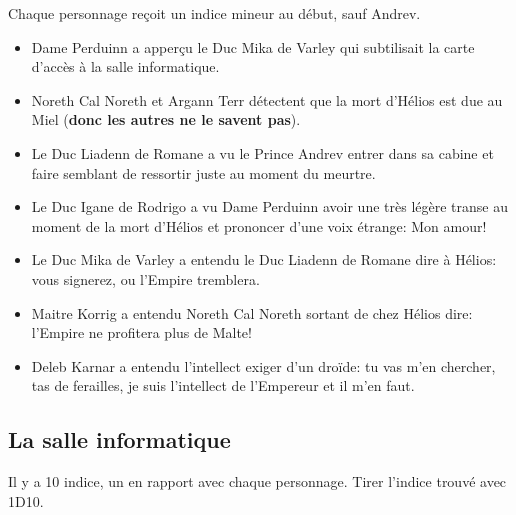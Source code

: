 \documentclass{article}
\begin{document}
Chaque personnage reçoit un indice mineur au début, sauf Andrev.
\begin{itemize}
    \item Dame Perduinn a apperçu le Duc Mika de Varley qui subtilisait la
        carte d'accès à la salle informatique.
    \item Noreth Cal Noreth et Argann Terr détectent que la mort d'Hélios est
        due au Miel (\textbf{donc les autres ne le savent pas}).
    \item Le Duc Liadenn de Romane a vu le Prince Andrev entrer dans sa cabine
        et faire semblant de ressortir juste au moment du meurtre.
    \item Le Duc Igane de Rodrigo a vu Dame Perduinn avoir une très légère
        transe au moment de la mort d'Hélios et prononcer d'une voix étrange:
        \og Mon amour!\fg{}
    \item Le Duc Mika de Varley a entendu le Duc Liadenn de Romane dire à
        Hélios: \og vous signerez, ou l'Empire tremblera\fg{}.
    \item Maitre Korrig a entendu Noreth Cal Noreth sortant de chez Hélios
        dire: \og l'Empire ne profitera plus de Malte!\fg{}
    \item Deleb Karnar a entendu l'intellect exiger d'un droïde: \og tu vas
        m'en chercher, tas de ferailles, je suis l'intellect de l'Empereur et
        il m'en faut\fg{}.
\end{itemize}

\subsection*{La salle informatique}

Il y a 10 indice, un en rapport avec chaque personnage. Tirer l'indice trouvé
avec 1D10.
\end{document}
